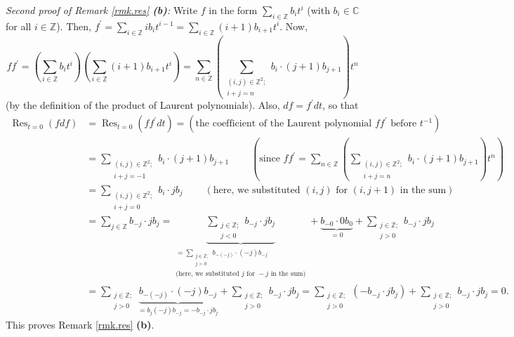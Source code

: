 \documentclass[etingof-lie.tex]{subfiles}
\begin{document}
\textit{Second proof of Remark \ref{rmk.res} \textbf{(b)}:} Write $f$ in the
form $\sum\limits_{i\in\mathbb{Z}}b_{i}t^{i}$ (with $b_{i}\in\mathbb{C}$ for
all $i\in\mathbb{Z}$). Then, $f^{\prime}=\sum\limits_{i\in\mathbb{Z}}%
ib_{i}t^{i-1}=\sum\limits_{i\in\mathbb{Z}}\left(  i+1\right)  b_{i+1}t^{i}$.
Now,%
\[
ff^{\prime}=\left(  \sum\limits_{i\in\mathbb{Z}}b_{i}t^{i}\right)  \left(
\sum\limits_{i\in\mathbb{Z}}\left(  i+1\right)  b_{i+1}t^{i}\right)
=\sum\limits_{n\in\mathbb{Z}}\left(  \sum\limits_{\substack{\left(
i,j\right)  \in\mathbb{Z}^{2};\\i+j=n}}b_{i}\cdot\left(  j+1\right)
b_{j+1}\right)  t^{n}%
\]
(by the definition of the product of Laurent polynomials). Also,
$df=f^{\prime}dt$, so that%
\begin{align*}
\operatorname*{Res}\nolimits_{t=0}\left(  fdf\right)   &  =\operatorname*{Res}%
\nolimits_{t=0}\left(  ff^{\prime}dt\right)  =\left(  \text{the coefficient of
the Laurent polynomial }ff^{\prime}\text{ before }t^{-1}\right) \\
&  =\sum\limits_{\substack{\left(  i,j\right)  \in\mathbb{Z}^{2}%
;\\i+j=-1}}b_{i}\cdot\left(  j+1\right)  b_{j+1}\ \ \ \ \ \ \ \ \ \ \left(
\text{since }ff^{\prime}=\sum\limits_{n\in\mathbb{Z}}\left(  \sum
\limits_{\substack{\left(  i,j\right)  \in\mathbb{Z}^{2};\\i+j=n}}b_{i}%
\cdot\left(  j+1\right)  b_{j+1}\right)  t^{n}\right) \\
&  =\sum\limits_{\substack{\left(  i,j\right)  \in\mathbb{Z}^{2}%
;\\i+j=0}}b_{i}\cdot jb_{j}\ \ \ \ \ \ \ \ \ \ \left(  \text{here, we
substituted }\left(  i,j\right)  \text{ for }\left(  i,j+1\right)  \text{ in
the sum}\right) \\
&  =\sum\limits_{j\in\mathbb{Z}}b_{-j}\cdot jb_{j}=\underbrace{\sum
\limits_{\substack{j\in\mathbb{Z};\\j<0}}b_{-j}\cdot jb_{j}}_{\substack{=\sum
\limits_{\substack{j\in\mathbb{Z};\\j>0}}b_{-\left(  -j\right)  }\cdot\left(
-j\right)  b_{-j}\\\text{(here, we substituted }j\text{ for }-j\text{ in the
sum)}}}+\underbrace{b_{-0}\cdot0b_{0}}_{=0}+\sum\limits_{\substack{j\in
\mathbb{Z};\\j>0}}b_{-j}\cdot jb_{j}\\
&  =\sum\limits_{\substack{j\in\mathbb{Z};\\j>0}}\underbrace{b_{-\left(
-j\right)  }\cdot\left(  -j\right)  b_{-j}}_{=b_{j}\left(  -j\right)
b_{-j}=-b_{-j}\cdot jb_{j}}+\sum\limits_{\substack{j\in\mathbb{Z}%
;\\j>0}}b_{-j}\cdot jb_{j}=\sum\limits_{\substack{j\in\mathbb{Z}%
;\\j>0}}\left(  -b_{-j}\cdot jb_{j}\right)  +\sum\limits_{\substack{j\in
\mathbb{Z};\\j>0}}b_{-j}\cdot jb_{j}=0.
\end{align*}
This proves Remark \ref{rmk.res} \textbf{(b)}.
\end{document}
